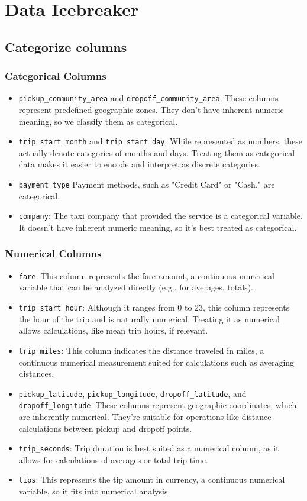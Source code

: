     \section{Data Icebreaker}
    \subsection{Categorize columns}
    \subsubsection{Categorical Columns}
    \begin{itemize}
        \item \texttt{pickup\_community\_area} and \texttt{dropoff\_community\_area}: These columns represent predefined geographic zones. They don't have inherent numeric meaning, so we classify them as categorical.
        \item \texttt{trip\_start\_month} and \texttt{trip\_start\_day}: While represented as numbers, these actually denote categories of months and days. Treating them as categorical data makes it easier to encode and interpret as discrete categories.
        \item \texttt{payment\_type} Payment methods, such as "Credit Card" or "Cash," are categorical.
        \item \texttt{company}: The taxi company that provided the service is a categorical variable. It doesn't have inherent numeric meaning, so it's best treated as categorical.    
    \end{itemize}
    \subsubsection{Numerical Columns}
    \begin{itemize}
        \item \texttt{fare}: This column represents the fare amount, a continuous numerical variable that can be analyzed directly (e.g., for averages, totals).
        \item \texttt{trip\_start\_hour}: Although it ranges from 0 to 23, this column represents the hour of the trip and is naturally numerical. Treating it as numerical allows calculations, like mean trip hours, if relevant.
        \item \texttt{trip\_miles}: This column indicates the distance traveled in miles, a continuous numerical measurement suited for calculations such as averaging distances.
        \item \texttt{pickup\_latitude}, \texttt{pickup\_longitude}, \texttt{dropoff\_latitude}, and \texttt{dropoff\_longitude}: These columns represent geographic coordinates, which are inherently numerical. They’re suitable for operations like distance calculations between pickup and dropoff points.
        \item \texttt{trip\_seconds}: Trip duration is best suited as a numerical column, as it allows for calculations of averages or total trip time.
        \item \texttt{tips}: This represents the tip amount in currency, a continuous numerical variable, so it fits into numerical analysis.
    \end{itemize}
